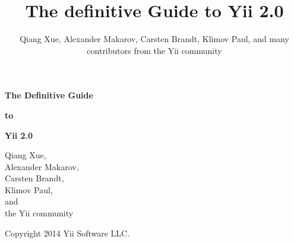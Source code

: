 \documentclass[a4paper,11pt,twoside]{book}
\title{The definitive Guide to Yii 2.0}
\author{
    Qiang Xue,
    Alexander Makarov,
    Carsten Brandt,
    Klimov Paul,
    and
    many contributors from the Yii community
}
\begin{document}
    \frontmatter

    \begin{titlepage}
        \setlength{\oddsidemargin}{-1in}
        \setlength{\evensidemargin}{-1in}
        \setlength{\textwidth}{\paperwidth}

        \vspace*{\fill}

        \noindent
        \parbox{\textwidth}{\centering \bfseries \Huge
            The Definitive Guide
        }\vspace{.5cm}
        \parbox{\textwidth}{\centering \bfseries \Huge
            to
        }\vspace{.5cm}
        \parbox{\textwidth}{\centering \bfseries \Huge
            Yii 2.0
        }

        \vfill

        \noindent
        \parbox{\textwidth}{\centering \Large
            Qiang Xue,\\
            Alexander Makarov,\\
            Carsten Brandt,\\
            Klimov Paul,\\
            and\\
            the Yii community
        }

        \vspace*{\fill}

        \noindent
        \parbox{\textwidth}{\centering
            Copyright 2014 Yii Software LLC.
        }
    \end{titlepage}

    \pagebreak \thispagestyle{empty} \cleardoublepage

    \setcounter{tocdepth}{1}
    \tableofcontents

    \mainmatter

	
\end{document}
